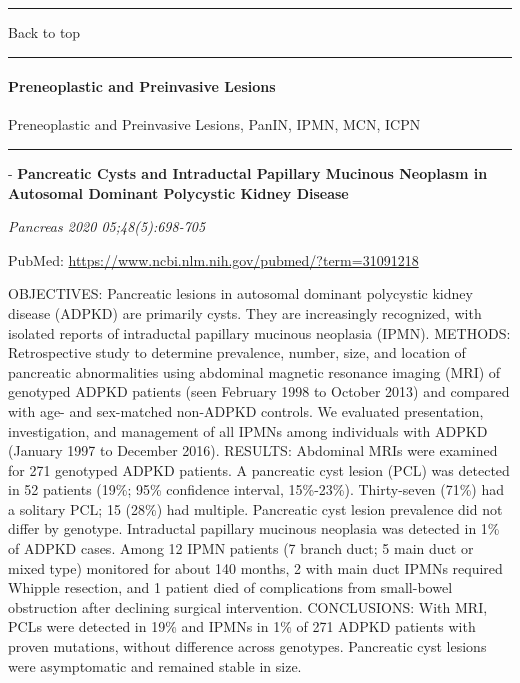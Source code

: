 \documentclass[]{article}
\let\oldparagraph\paragraph
\renewcommand{\paragraph}[1]{\oldparagraph{#1}\mbox{}}
\begin{document}
{}

{}

\begin{center}\rule{0.5\linewidth}{\linethickness}\end{center}

Back to top

\begin{center}\rule{0.5\linewidth}{\linethickness}\end{center}

\pagebreak

\hypertarget{preneoplastic-and-preinvasive-lesions}{%
\paragraph{Preneoplastic and Preinvasive
Lesions}\label{preneoplastic-and-preinvasive-lesions}}

Preneoplastic and Preinvasive Lesions, PanIN, IPMN, MCN, ICPN

\begin{center}\rule{0.5\linewidth}{\linethickness}\end{center}

 - \textbf{Pancreatic Cysts and Intraductal Papillary Mucinous Neoplasm
in Autosomal Dominant Polycystic Kidney Disease}

\emph{Pancreas 2020 05;48(5):698-705}

PubMed: \url{https://www.ncbi.nlm.nih.gov/pubmed/?term=31091218}

OBJECTIVES: Pancreatic lesions in autosomal dominant polycystic kidney
disease (ADPKD) are primarily cysts. They are increasingly recognized,
with isolated reports of intraductal papillary mucinous neoplasia
(IPMN). METHODS: Retrospective study to determine prevalence, number,
size, and location of pancreatic abnormalities using abdominal magnetic
resonance imaging (MRI) of genotyped ADPKD patients (seen February 1998
to October 2013) and compared with age- and sex-matched non-ADPKD
controls. We evaluated presentation, investigation, and management of
all IPMNs among individuals with ADPKD (January 1997 to December 2016).
RESULTS: Abdominal MRIs were examined for 271 genotyped ADPKD patients.
A pancreatic cyst lesion (PCL) was detected in 52 patients (19\%; 95\%
confidence interval, 15\%-23\%). Thirty-seven (71\%) had a solitary PCL;
15 (28\%) had multiple. Pancreatic cyst lesion prevalence did not differ
by genotype. Intraductal papillary mucinous neoplasia was detected in
1\% of ADPKD cases. Among 12 IPMN patients (7 branch duct; 5 main duct
or mixed type) monitored for about 140 months, 2 with main duct IPMNs
required Whipple resection, and 1 patient died of complications from
small-bowel obstruction after declining surgical intervention.
CONCLUSIONS: With MRI, PCLs were detected in 19\% and IPMNs in 1\% of
271 ADPKD patients with proven mutations, without difference across
genotypes. Pancreatic cyst lesions were asymptomatic and remained stable
in size.
\end{document}
